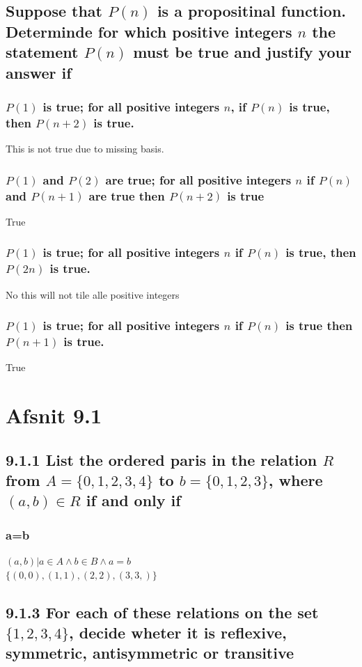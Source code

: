 \documentclass[12pt, a4paper]{report}
\begin{document}
				\setcounter{subsection}{24}
				\subsection{Suppose that $P(n)$ is a propositinal function. Determinde for which positive integers $n$ the statement $P(n)$ must be true and justify your answer if}
					\subsubsection{$P(1)$ is true; for all positive integers $n$, if $P(n)$ is true, then $P(n+2)$ is true.}
						This is not true due to missing basis.
					\subsubsection{$P(1)$ and $P(2)$ are true; for all positive integers $n$ if $P(n)$ and $P(n+1)$ are true then $P(n+2)$ is true}
						True
					\subsubsection{$P(1)$ is true; for all positive integers $n$ if $P(n)$ is true, then $P(2n)$ is true.}
						No this will not tile alle positive integers
					\subsubsection{$P(1)$ is true; for all positive integers $n$ if $P(n)$ is true then $P(n+1)$ is true.}
						True
			\section{Afsnit 9.1}
				\setcounter{subsection}{0}
				\subsection{9.1.1 List the ordered paris in the relation $R$ from $A=\{0,1,2,3,4\}$ to $b=\{0,1,2,3\}$, where $(a,b)\in R$ if and only if}
					\subsubsection{a=b}
						$(a,b)|a\in A \land b \in B \land a=b$\\
						$\{(0,0),(1,1),(2,2),(3,3,)\}$
				\setcounter{subsection}{2}
				\subsection{9.1.3 For each of these relations on the set $\{1,2,3,4\}$, decide wheter it is reflexive, symmetric, antisymmetric or transitive}
\end{document}
